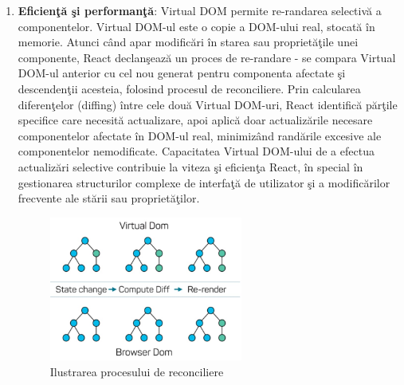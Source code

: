 \documentclass[12pt, a4paper]{report}
\begin{document}
\begin{enumerate}
	\item \textbf{Eficien\c t\u a \c si performan\c t\u a}: Virtual DOM permite re-randarea selectiv\u a a componentelor. Virtual DOM-ul este o copie a DOM-ului real, stocat\u a \^in memorie. Atunci c\^and apar modific\u ari \^in starea sau propriet\u a\c tile unei componente, React declan\c seaz\u a un proces de re-randare - se compara Virtual DOM-ul anterior cu cel nou generat pentru componenta afectate \c si descenden\c tii acesteia, folosind procesul de reconciliere. Prin calcularea diferen\c telor (diffing) \^intre cele dou\u a Virtual DOM-uri, React identific\u a p\u ar\c tile specifice care necesit\u a actualizare, apoi aplic\u a doar actualiz\u arile necesare componentelor afectate \^in DOM-ul real, minimiz\^and rand\u arile excesive ale componentelor nemodificate. Capacitatea Virtual DOM-ului de a efectua actualiz\u ari selective contribuie la viteza \c si eficien\c ta React, \^in special \^in gestionarea structurilor complexe de interfa\c t\u a de utilizator \c si a modific\u arilor frecvente ale st\u arii sau propriet\u a\c tilor.
	\begin{figure}[htbp]
		\centering
		\includegraphics[width=0.6\textwidth]{virtual-dom.jpeg}
		\caption{Ilustrarea procesului de reconciliere}\protect\footnotemark
		\label{fig:virtual-dom}
	\end{figure}


\end{enumerate}
\end{document}
